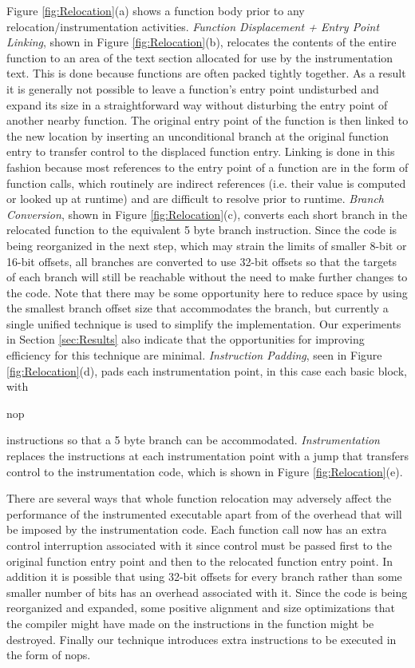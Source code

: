 Figure \ref{fig:Relocation}(a) shows a function body prior to any
relocation/instrumentation activities. \textit{Function Displacement + Entry
Point Linking}, shown in Figure \ref{fig:Relocation}(b), relocates the contents
of the entire function to an area of the text section allocated for use by the
instrumentation text. This is done because functions are often packed tightly
together. As a result it is generally not possible to leave a function's entry
point undisturbed and expand its size in a straightforward way without
disturbing the entry point of another nearby function. The original entry point
of the function is then linked to the new location by inserting
an unconditional branch at the original function entry to transfer control to
the displaced function entry. Linking is done in this fashion because most
references to the entry point of a function are in the form of function calls,
which routinely are indirect references (i.e. their value is computed or looked
up at runtime) and are difficult to resolve prior to runtime. \textit{Branch
Conversion}, shown in Figure \ref{fig:Relocation}(c), converts each short branch
in the relocated function to the equivalent 5 byte branch instruction. Since the
code is being reorganized in the next step, which may strain the limits of
smaller 8-bit or 16-bit offsets, all branches are converted to use 32-bit
offsets so that the targets of each branch will still be reachable without the
need to make further changes to the code. Note that there may be some
opportunity here to reduce space by using the smallest branch offset size that
accommodates the branch, but currently a single unified technique is used
to simplify the implementation. Our experiments in Section
\ref{sec:Results} also indicate that the opportunities for improving efficiency
for this technique are minimal. \textit{Instruction Padding}, seen in Figure
\ref{fig:Relocation}(d), pads each instrumentation point, in this case each
basic block, with \begin{it}nop\end{it} instructions so that a 5 byte branch can
be accommodated. \textit{Instrumentation} replaces the instructions at each
instrumentation point with a jump that transfers control to the instrumentation
code, which is shown in Figure \ref{fig:Relocation}(e).

There are several ways that whole function relocation may adversely affect the
performance of the instrumented executable apart from of the overhead that
will be imposed by the instrumentation code. Each function call now
has an extra control interruption associated with it since control must be
passed first to the original function entry point and then to the relocated
function entry point. In addition it is possible that using 32-bit offsets for
every branch rather than some smaller number of bits has an overhead associated
with it. Since the code is being reorganized and expanded, some positive
alignment and size optimizations that the compiler might have made on the
instructions in the function might be destroyed. Finally our technique
introduces extra instructions to be executed in the form of nops.


